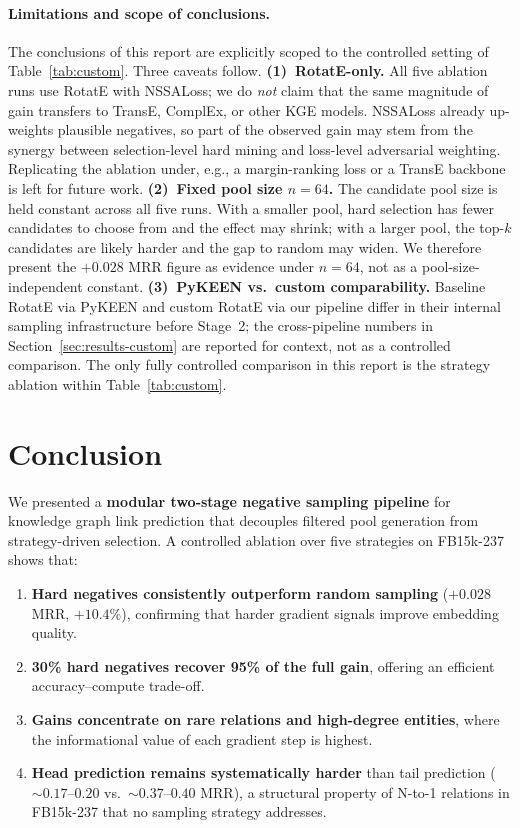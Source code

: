 \documentclass[10pt,twocolumn,letterpaper]{article}
\begin{document}
\paragraph{Limitations and scope of conclusions.}
The conclusions of this report are explicitly scoped to the controlled
setting of Table~\ref{tab:custom}. Three caveats follow.
\textbf{(1)~RotatE-only.} All five ablation runs use RotatE with
NSSALoss; we do \emph{not} claim that the same magnitude of gain transfers
to TransE, ComplEx, or other KGE models. NSSALoss already up-weights
plausible negatives, so part of the observed gain may stem from the
synergy between selection-level hard mining and loss-level adversarial
weighting. Replicating the ablation under, e.g., a margin-ranking loss or
a TransE backbone is left for future work.
\textbf{(2)~Fixed pool size $n=64$.} The candidate pool size is held
constant across all five runs. With a smaller pool, hard selection has
fewer candidates to choose from and the effect may shrink; with a larger
pool, the top-$k$ candidates are likely harder and the gap to random may
widen. We therefore present the $+0.028$ MRR figure as evidence under
$n=64$, not as a pool-size-independent constant.
\textbf{(3)~PyKEEN vs.\ custom comparability.} Baseline RotatE via PyKEEN
and custom RotatE via our pipeline differ in their internal sampling
infrastructure before Stage~2; the cross-pipeline numbers in
Section~\ref{sec:results-custom} are reported for context, not as a
controlled comparison. The only fully controlled comparison in this report
is the strategy ablation within Table~\ref{tab:custom}.

\section{Conclusion}
\label{sec:conclusion}

We presented a \textbf{modular two-stage negative sampling pipeline} for
knowledge graph link prediction that decouples filtered pool generation
from strategy-driven selection. A controlled ablation over five strategies
on FB15k-237 shows that:

\begin{enumerate}
  \item \textbf{Hard negatives consistently outperform random sampling}
    ($+0.028$ MRR, $+10.4\%$), confirming that harder gradient signals
    improve embedding quality.
  \item \textbf{30\% hard negatives recover 95\% of the full gain},
    offering an efficient accuracy--compute trade-off.
  \item \textbf{Gains concentrate on rare relations and high-degree entities},
    where the informational value of each gradient step is highest.
  \item \textbf{Head prediction remains systematically harder} than tail
    prediction ($\sim\!0.17$--$0.20$ vs.\ $\sim\!0.37$--$0.40$ MRR),
    a structural property of N-to-1 relations in FB15k-237 that no
    sampling strategy addresses.
\end{enumerate}
\end{document}
